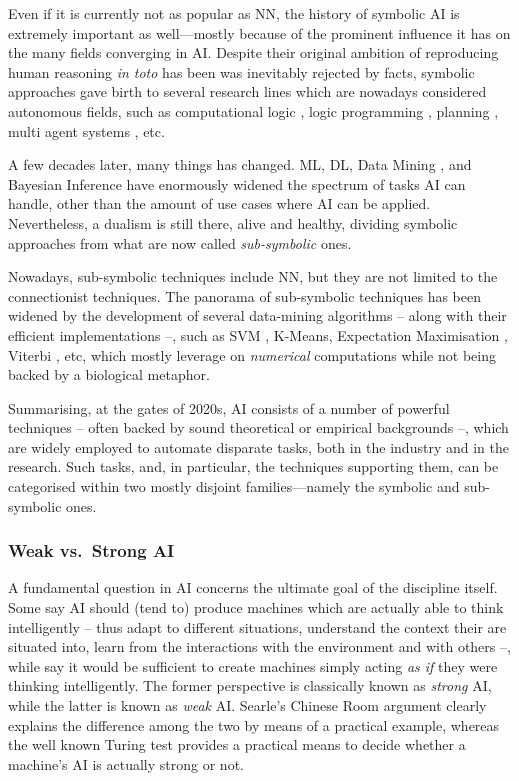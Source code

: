 \documentclass[12pt,a4paper,openright,twoside]{book}
\begin{document}
Even if it is currently not as popular as NN, the history of symbolic AI is extremely important as well---mostly because of the prominent influence it has on the many fields converging in AI.
%
Despite their original ambition of reproducing human reasoning \emph{in toto} has been was inevitably rejected by facts, symbolic approaches gave birth to several research lines which are nowadays considered autonomous fields, such as computational logic \cite{lloyd1990computational}, logic programming \cite{apt1990logic}, planning \cite[Chap. 10-11]{russell2016artificial}, multi agent systems \cite{ferber1999multi}, etc. 

A few decades later, many things has changed.
%
ML, DL, Data Mining \cite{hand2006data}, and Bayesian Inference have enormously widened the spectrum of tasks AI can handle, other than the amount of use cases where AI can be applied.
%
Nevertheless, a dualism is still there, alive and healthy, dividing symbolic approaches from what are now called \emph{sub-symbolic}  ones.

Nowadays, sub-symbolic techniques include NN, but they are not limited to the connectionist techniques.
%
The panorama of sub-symbolic techniques has been widened by the development of several data-mining algorithms -- along with their efficient implementations --, such as SVM \cite{Smola2004}, K-Means, Expectation Maximisation \cite{Dempster77maximumlikelihood}, Viterbi \cite{Viterbi06}, etc, which mostly leverage on \emph{numerical} computations while not being backed by a biological metaphor.

Summarising, at the gates of 2020s, AI consists of a number of powerful techniques -- often backed by sound theoretical or empirical backgrounds --, which are widely employed to automate disparate tasks, both in the industry and in the research.
%
Such tasks, and, in particular, the techniques supporting them, can be categorised within two mostly disjoint families---namely the symbolic and sub-symbolic ones.

\subsubsection{Weak vs.\ Strong AI}

A fundamental question in AI concerns the ultimate goal of the discipline itself.
%
Some say AI should (tend to) produce machines which are actually able to think intelligently -- thus adapt to different situations, understand the context their are situated into, learn from the interactions with the environment and with others --, while say it would be sufficient to create machines simply acting \emph{as if} they were thinking intelligently.
%
The former perspective is classically known as \emph{strong} AI, while the latter is known as \emph{weak} AI.
%
Searle's Chinese Room argument \cite{searle1980} clearly explains the difference among the two by means of a practical example, whereas the well known Turing test \cite{Turing1950} provides a practical means to decide whether a machine's AI is actually strong or not.
\end{document}
